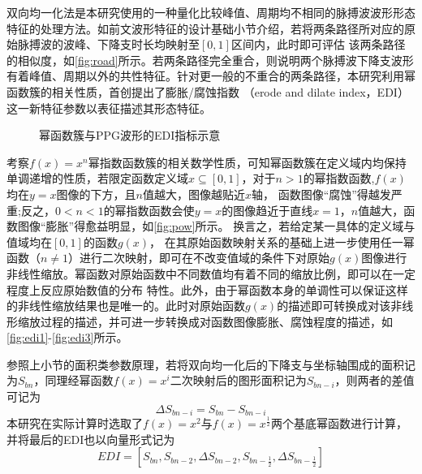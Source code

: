 双向均一化法是本研究使用的一种量化比较峰值、周期均不相同的脉搏波波形形态特征的处理方法。如前文波形特征的设计基础小节介绍，若将两条路径所对应的原始脉搏波的波峰、下降支时长均映射至$[0,1]$区间内，此时即可评估
该两条路径的相似度，如\autoref{fig:road}所示。若两条路径完全重合，则说明两个脉搏波下降支波形有着峰值、周期以外的共性特征。针对更一般的不重合的两条路径，本研究利用幂函数簇的相关性质，首创提出了膨胀/腐蚀指数
（erode and dilate index，EDI）这一新特征参数以表征描述其形态特征。
\begin{figure}[h]
    \centering
    \quad
    \quad
    \quad
    \caption{\label{fig:powandedi}幂函数簇与PPG波形的EDI指标示意}
\end{figure}


考察$f(x)=x^n$幂指数函数簇的相关数学性质，可知幂函数簇在定义域内均保持单调递增的性质，若限定函数定义域$x\subseteq [0,1]$，对于$n>1$的幂指数函数,$f(x)$均在$y=x$图像的下方，且$n$值越大，图像越贴近$x$轴，
函数图像“腐蚀”得越发严重;反之，$0<n<1$的幂指数函数会使$y=x$的图像趋近于直线$x=1$，$n$值越大，函数图像“膨胀”得愈益明显，如\autoref{fig:pow}所示。
换言之，若给定某一具体的定义域与值域均在$[0,1]$的函数$g(x)$，
在其原始函数映射关系的基础上进一步使用任一幂函数（$n\neq 1$）进行二次映射，即可在不改变值域的条件下对原始$g(x)$图像进行非线性缩放。幂函数对原始函数中不同数值均有着不同的缩放比例，即可以在一定程度上反应原始数值的分布
特性。此外，由于幂函数本身的单调性可以保证这样的非线性缩放结果也是唯一的。此时对原始函数$g(x)$的描述即可转换成对该非线形缩放过程的描述，并可进一步转换成对函数图像膨胀、腐蚀程度的描述，如\autoref{fig:edi1}-\autoref{fig:edi3}所示。

参照上小节的面积类参数原理，若将双向均一化后的下降支与坐标轴围成的面积记为$S_{bn}$，同理经幂函数$f(x)=x^i$二次映射后的图形面积记为$S_{bn-i}$，则两者的差值可记为
\begin{equation}
    \label{equ:sbn}
    \Delta S_{bn-i}=S_{bn}-S_{bn-i}
\end{equation}
本研究在实际计算时选取了$f(x)=x^2$与$f(x)=x^{\frac{1}{2}}$两个基底幂函数进行计算，并将最后的EDI也以向量形式记为
\begin{equation}
    \label{equ:edi}
    EDI=[S_{bn},S_{bn-2},\Delta S_{bn-2},S_{bn-\frac{1}{2}},\Delta S_{bn-\frac{1}{2}}]
\end{equation}


